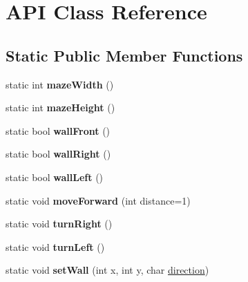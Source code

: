 \hypertarget{class_a_p_i}{}\section{A\+PI Class Reference}
\label{class_a_p_i}
\subsection*{Static Public Member Functions}
\begin{DoxyCompactItemize}
\item 
\mbox{\label{class_a_p_i_aad4f60e45d012af3985946b3a3bd561c}} 
static int {\bfseries maze\+Width} ()
\item 
\mbox{\label{class_a_p_i_ae356a8b8b3090ec8e5e66fb9d7e827a6}} 
static int {\bfseries maze\+Height} ()
\item 
\mbox{\label{class_a_p_i_a3452beb4232e7960ffdb8c0d4a1f0d30}} 
static bool {\bfseries wall\+Front} ()
\item 
\mbox{\label{class_a_p_i_acdc812c3acadeb2890691e6c95a89816}} 
static bool {\bfseries wall\+Right} ()
\item 
\mbox{\label{class_a_p_i_a43b1e7f9b91aba577078af681c7807b3}} 
static bool {\bfseries wall\+Left} ()
\item 
\mbox{\label{class_a_p_i_a25ace37c644938df32f6dae69abfe052}} 
static void {\bfseries move\+Forward} (int distance=1)
\item 
\mbox{\label{class_a_p_i_a4b5aaf5e3e061474d84191ab9ee05d63}} 
static void {\bfseries turn\+Right} ()
\item 
\mbox{\label{class_a_p_i_af04ee9209026f2a6e1c502e6c900573f}} 
static void {\bfseries turn\+Left} ()
\item 
\mbox{\label{class_a_p_i_a9b0b04cf1cfc62ae6f5eef1ac1729eb2}} 
static void {\bfseries set\+Wall} (int x, int y, char \hyperlink{util_8h_a99f26e6ee9fcd62f75203b5402df8098}{direction})
\item 
\mbox{\label{class_a_p_i_a3178d408a832d81500847ca62ce1f509}} 

\end{DoxyCompactItemize}
